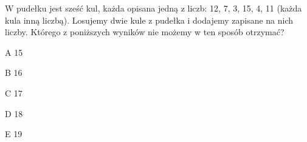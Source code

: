 \begin{tresc}
W pudełku jest sześć kul, każda opisana jedną z liczb: 12, 7, 3, 15, 4, 11 (każda kula inną liczbą). Losujemy dwie kule z pudełka i dodajemy zapisane na nich liczby. Którego z poniższych wyników nie możemy w ten sposób otrzymać?
\end{tresc}
\begin{wariant}{A} 15 \end{wariant}
\begin{wariant}{B} 16 \end{wariant}
\begin{wariant}{C} 17 \end{wariant}
\begin{wariant}{D} 18 \end{wariant}
\begin{wariant}{E} 19 \end{wariant}
